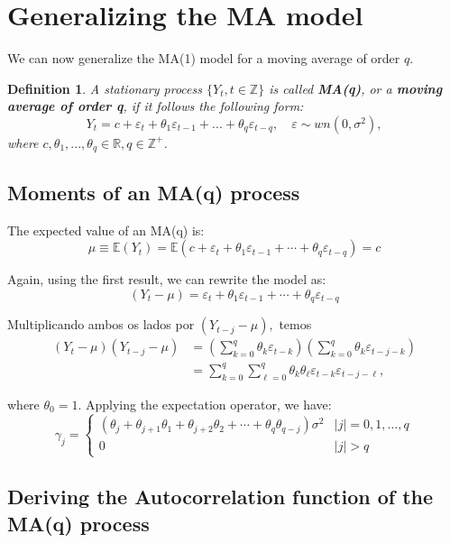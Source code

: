 \documentclass[11pt, a4paper]{report}
\theoremstyle{plain}
\theoremstyle{plain}
\newtheorem{defn}{Definition}[section]
\theoremstyle{remark}
\begin{document}
\section{Generalizing the MA model}

We can now generalize the MA(1) model for a moving average of order $q$.

\begin{defn}
	A stationary process $\{Y_t, t \in \mathbb{Z} \}$ is called \textbf{MA(q)}, or a \textbf{moving average of order q}, if it follows the following form:
	$$ Y_t = c + \varepsilon_t + \theta_1 \varepsilon_{t-1} + ... + \theta_q \varepsilon_{t-q}, \hspace{1em} \varepsilon \sim wn(0, \sigma^2), $$
	where $c, \theta_1, ..., \theta_q \in \mathbb{R}, q \in \mathbb{Z}^+$.
\end{defn}

\subsection{Moments of an MA(q) process}

The expected value of an MA(q) is:
$$
\mu \equiv \mathbb{E}\left(Y_{t}\right)=\mathbb{E}\left(c+\varepsilon_{t}+\theta_{1} \varepsilon_{t-1}+\cdots+\theta_{q} \varepsilon_{t-q}\right)=c
$$

Again, using the first result, we can rewrite the model as:
$$
\left(Y_{t}-\mu\right)=\varepsilon_{t}+\theta_{1} \varepsilon_{t-1}+\cdots+\theta_{q} \varepsilon_{t-q}
$$

Multiplicando ambos os lados por $\left(Y_{t-j}-\mu\right),$ temos
$$
\begin{aligned}
	\left(Y_{t}-\mu\right)\left(Y_{t-j}-\mu\right) &=\left(\sum_{k=0}^{q} \theta_{k} \varepsilon_{t-k}\right)\left(\sum_{k=0}^{q} \theta_{k} \varepsilon_{t-j-k}\right) \\
	&=\sum_{k=0}^{q} \sum_{\ell=0}^{q} \theta_{k} \theta_{\ell} \varepsilon_{t-k} \varepsilon_{t-j-\ell},
\end{aligned}
$$

where $\theta_{0}=1 .$ Applying the expectation operator, we have:
$$
\gamma_{j}=\left\{\begin{array}{ll}
	\left(\theta_{j}+\theta_{j+1} \theta_{1}+\theta_{j+2} \theta_{2}+\cdots+\theta_{q} \theta_{q-j}\right) \sigma^{2} & |j|=0,1, \ldots, q \\
	0 & |j|>q
\end{array}\right.
$$

\subsection{Deriving the Autocorrelation function of the MA(q) process}
\end{document}
